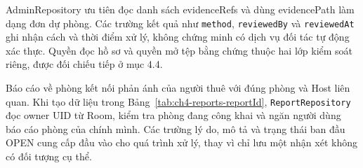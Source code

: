 AdminRepository ưu tiên đọc danh sách evidenceRefs và dùng evidencePath làm dạng đơn dự phòng. Các trường kết quả như \texttt{method}, \texttt{reviewed\allowbreak{}By} và \texttt{reviewed\allowbreak{}At} ghi nhận cách và thời điểm xử lý, không chứng minh có dịch vụ đối tác tự động xác thực. Quyền đọc hồ sơ và quyền mở tệp bằng chứng thuộc hai lớp kiểm soát riêng, được đối chiếu tiếp ở mục 4.4.

Báo cáo về phòng kết nối phản ánh của người thuê với đúng phòng và Host liên quan. Khi tạo dữ liệu trong Bảng~\ref{tab:ch4-reports-reportId}, \texttt{Report\allowbreak{}Repository} đọc owner UID từ Room, kiểm tra phòng đang công khai và ngăn người dùng báo cáo phòng của chính mình. Các trường lý do, mô tả và trạng thái ban đầu OPEN cung cấp đầu vào cho quá trình xử lý, thay vì chỉ lưu một nhận xét không có đối tượng cụ thể.

